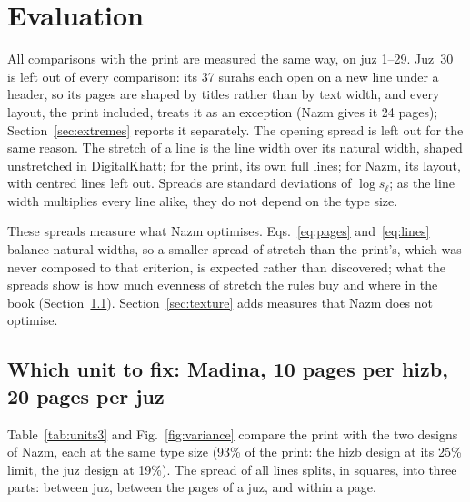 \documentclass[sigconf,nonacm]{acmart}
\begin{document}
\section{Evaluation}\label{sec:results}
All comparisons with the print are measured the same way, on juz 1--29. Juz~30 is left out of every comparison: its 37 surahs each open on a new line under a header, so its pages are shaped by titles rather than by text width, and every layout, the print included, treats it as an exception (Nazm gives it 24 pages); Section~\ref{sec:extremes} reports it separately. The opening spread is left out for the same reason. The stretch of a line is the line width over its natural width, shaped unstretched in DigitalKhatt; for the print, its own full lines; for Nazm, its layout, with centred lines left out. Spreads are standard deviations of $\log s_\ell$; as the line width multiplies every line alike, they do not depend on the type size.

These spreads measure what Nazm optimises. Eqs.~\ref{eq:pages} and~\ref{eq:lines} balance natural widths, so a smaller spread of stretch than the print's, which was never composed to that criterion, is expected rather than discovered; what the spreads show is how much evenness of stretch the rules buy and where in the book (Section~\ref{sec:units-eval}). Section~\ref{sec:texture} adds measures that Nazm does not optimise.

\subsection{Which unit to fix: Madina, 10 pages per hizb, 20 pages per juz}\label{sec:units-eval}
Table~\ref{tab:units3} and Fig.~\ref{fig:variance} compare the print with the two designs of Nazm, each at the same type size (93\% of the print: the hizb design at its 25\% limit, the juz design at 19\%). The spread of all lines splits, in squares, into three parts: between juz, between the pages of a juz, and within a page.
\end{document}
